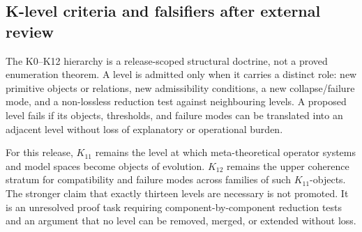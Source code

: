 \clearpage


\subsection{K-level criteria and falsifiers after external review}
\label{sec:oc13-k-level-criteria-v3}

The K0--K12 hierarchy is a release-scoped structural doctrine, not a proved
enumeration theorem. A level is admitted only when it carries a distinct role:
new primitive objects or relations, new admissibility conditions, a new
collapse/failure mode, and a non-lossless reduction test against neighbouring
levels. A proposed level fails if its objects, thresholds, and failure modes can
be translated into an adjacent level without loss of explanatory or operational
burden.

For this release, \(K_{11}\) remains the level at which meta-theoretical
operator systems and model spaces become objects of evolution. \(K_{12}\)
remains the upper coherence stratum for compatibility and failure modes across
families of such \(K_{11}\)-objects. The stronger claim that exactly thirteen
levels are necessary is not promoted. It is an unresolved proof task requiring
component-by-component reduction tests and an argument that no level can be
removed, merged, or extended without loss.
